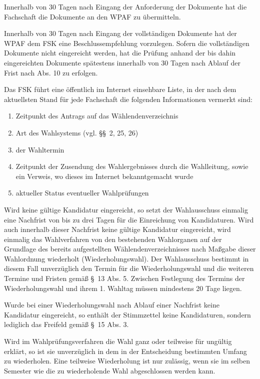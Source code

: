\documentclass[%
draft,%
multilinesections%
]{fswo}
\begin{document}
\begin{contract}
Innerhalb von 30 Tagen nach Eingang der Anforderung der Dokumente hat die Fachschaft die Dokumente an den WPAF zu übermitteln.

Innerhalb von 30 Tagen nach Eingang der vollständigen Dokumente hat der WPAF dem FSK eine Beschlussempfehlung vorzulegen.
Sofern die vollständigen Dokumente nicht eingereicht werden, hat die Prüfung anhand der bis dahin eingereichten Dokumente spätestens innerhalb von 30 Tagen nach Ablauf der Frist nach Abs. 10 zu erfolgen.

Das FSK führt eine öffentlich im Internet einsehbare Liste, in der nach dem aktuellsten Stand für jede Fachschaft die folgenden Informationen vermerkt sind:
\begin{enumerate}
\item Zeitpunkt des Antrags auf das Wählendenverzeichnis
\item Art des Wahlsystems (vgl. \S\S~2, 25, 26)
\item der Wahltermin
\item Zeitpunkt der Zusendung des Wahlergebnisses durch die Wahlleitung, sowie ein Verweis, wo dieses im Internet bekanntgemacht wurde
\item aktueller Status eventueller Wahlprüfungen
\end{enumerate}

Wird keine gültige Kandidatur eingereicht, so setzt der Wahlausschuss einmalig eine Nachfrist von bis zu drei Tagen für die Einreichung von Kandidaturen.
Wird auch innerhalb dieser Nachfrist keine gültige Kandidatur eingereicht, wird einmalig das Wahlverfahren von den bestehenden Wahlorganen auf der Grundlage des bereits aufgestellten Wählendenverzeichnisses nach Maßgabe dieser Wahlordnung wiederholt (Wiederholungswahl).
Der Wahlausschuss bestimmt in diesem Fall unverzüglich den Termin für die Wiederholungswahl und die weiteren Termine und Fristen gemäß \S~13 Abs. 5.
Zwischen Festlegung des Termins der Wiederholungswahl und ihrem 1. Wahltag müssen mindestens 20 Tage liegen.

Wurde bei einer Wiederholungswahl nach Ablauf einer Nachfrist keine Kandidatur eingereicht, so enthält der Stimmzettel keine Kandidaturen, sondern lediglich das Freifeld gemäß \S~15 Abs. 3.

Wird im Wahlprüfungsverfahren die Wahl ganz oder teilweise für ungültig erklärt, so ist sie unverzüglich in dem in der Entscheidung bestimmten Umfang zu wiederholen.
Eine teilweise Wiederholung ist nur zulässig, wenn sie im selben Semester wie die zu wiederholende Wahl abgeschlossen werden kann.


\end{contract}
\end{document}
